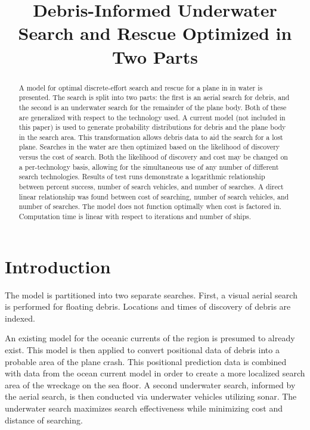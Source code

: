 \documentclass[a4paper]{article}
\title{Debris-Informed Underwater Search and Rescue Optimized in Two Parts}
\author{}
\date{}
\begin{document}
\maketitle

\begin{abstract}
A model for optimal discrete-effort search and rescue for a plane in in water is presented. The search is split into two parts: the first is an aerial search for debris, and the second is an underwater search for the remainder of the plane body. Both of these are generalized with respect to the technology used. A current model (not included in this paper) is used to generate probability distributions for debris and the plane body in the search area. This transformation allows debris data to aid the search for a lost plane. Searches in the water are then optimized based on the likelihood of discovery versus the cost of search. Both the likelihood of discovery and cost may be changed on a per-technology basis, allowing for the simultaneous use of any number of different search technologies. Results of test runs demonstrate a logarithmic relationship between percent success, number of search vehicles, and number of searches. A direct linear relationship was found between cost of searching, number of search vehicles, and number of searches. The model does not function optimally when cost is factored in. Computation time is linear with respect to iterations and number of ships. 
\end{abstract}

\pagebreak 

\section{Introduction}

The model is partitioned into two separate searches. First, a visual aerial search is performed for floating debris. Locations and times of discovery of debris are indexed. 

An existing model for the oceanic currents of the region is presumed to already exist. This model is then applied to convert positional data of debris into a probable area of the plane crash.  This positional prediction data is combined with data from the ocean current model in order to create a more localized search area of the wreckage on the sea floor. A second underwater search, informed by the aerial search, is then conducted via underwater vehicles utilizing sonar. The underwater search maximizes search effectiveness while minimizing cost and distance of searching. 
\end{document}
